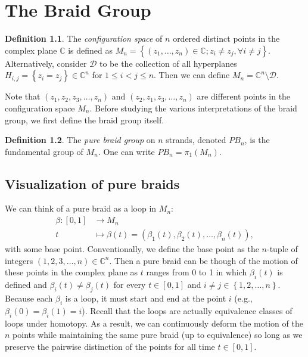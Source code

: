 \documentclass[12pt]{report}
\newcommand{\C}{\mathbb{C}}
\theoremstyle{definition}
\newtheorem{definition}{Definition}[chapter]
\begin{document}
\chapter{The Braid Group}
\begin{definition}
    The \textit{configuration space} of $n$ ordered distinct points in the complex plane $\C$ is defined as $M_n = \left\{ \left( z_1,\dots,z_n \right)\in\C ; z_i\neq z_j,\forall i\neq j \right\}$. Alternatively, consider $\mathcal{D}$ to be the collection of all hyperplanes $H_{i,j}=\left\{ z_i=z_j \right\}\in\C^n$ for $1\leq i < j \leq n$. Then we can define $M_n = \C^n \setminus \mathcal{D}$.
\end{definition}

Note that $\left( z_1,z_2,z_3,\dots,z_n \right)$ and $\left( z_2,z_1,z_3,\dots,z_n \right)$ are different points in the configuration space $M_n$. Before studying the various interpretations of the braid group, we first define the braid group itself.

\begin{definition}
    The \textit{pure braid group} on $n$ strands, denoted $PB_n$, is the fundamental group of $M_n$. One can write $PB_n = \pi_1(M_n)$.
\end{definition}

\section{Visualization of pure braids}

We can think of a pure braid as a loop in $M_n$:
\begin{align*}
    \beta : \left[ 0,1 \right] &\to M_n \\
    t &\mapsto \beta(t) = \left( \beta_1(t),\beta_2(t),\dots,\beta_n(t) \right),
\end{align*}
with some base point. Conventionally, we define the base point as the $n$-tuple of integers $(1,2,3,\dots,n)\in \C^n$. Then a pure braid can be though of the motion of these points in the complex plane as $t$ ranges from 0 to 1 in which $\beta_i(t)$ is defined and $\beta_i(t)\neq \beta_j(t)$ for every $t\in[0,1]$ and $i\neq j\in\left\{ 1,2,\dots,n \right\}$. Because each $\beta_i$ is a loop, it must start and end at the point $i$ (e.g., $\beta_i(0)=\beta_i(1)=i$). Recall that the loops are actually equivalence classes of loops under homotopy. As a result, we can continuously deform the motion of the $n$ points while maintaining the same pure braid (up to equivalence) so long as we preserve the pairwise distinction of the points for all time $t\in[0,1]$.
\end{document}
